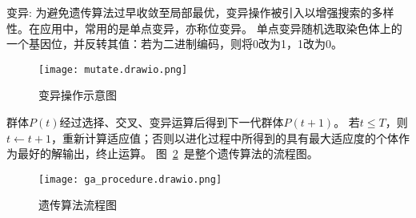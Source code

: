 变异:
为避免遗传算法过早收敛至局部最优，变异操作被引入以增强搜索的多样性。在应用中，常用的是单点变异，亦称位变异。
单点变异随机选取染色体上的一个基因位，并反转其值：若为二进制编码，则将0改为1，1改为0。
\begin{figure}[h]
  \centering
  \texttt{[image: mutate.drawio.png]}
  \caption{变异操作示意图}
  \label{fig:mutate}
\end{figure}

群体$P(t)$经过选择、交叉、变异运算后得到下一代群体$P(t+1)$。
若$t\leq T$，则 $t \leftarrow t + 1$，重新计算适应值；否则以进化过程中所得到的具有最大适应度的个体作为最好的解输出，终止运算。
图~\ref{fig:ga_procedure}~是整个遗传算法的流程图。
\begin{figure}[h]
  \centering
  \texttt{[image: ga\_procedure.drawio.png]}
  \caption{遗传算法流程图}
  \label{fig:ga_procedure}
\end{figure}



